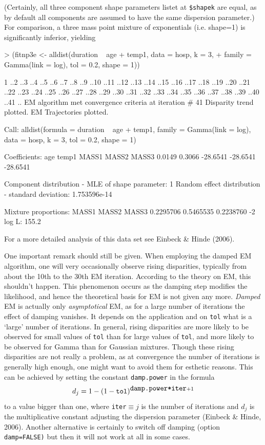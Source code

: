 \documentclass[a4paper]{article}
\begin{document}
\begin{landscape}
(Certainly, all three component shape parameters listet at {\tt \$shapek} are equal, as by default all components are assumed 
to have the same dispersion parameter.) For comparison, a three mass point mixture of exponentials (i.e. shape=1) is significantly inferior, yielding
\begin{Schunk}
\begin{Sinput}
> (fitnp3e <- alldist(duration ~ age + temp1, data = hosp, k = 3, 
+     family = Gamma(link = log), tol = 0.2, shape = 1))
\end{Sinput}
\begin{Soutput}
1 ..2 ..3 ..4 ..5 ..6 ..7 ..8 ..9 ..10 ..11 ..12 ..13 ..14 ..15 ..16 ..17 ..18 ..19 ..20 ..21 ..22 ..23 ..24 ..25 ..26 ..27 ..28 ..29 ..30 ..31 ..32 ..33 ..34 ..35 ..36 ..37 ..38 ..39 ..40 ..41 ..
EM algorithm met convergence criteria at iteration #  41 
Disparity trend plotted.
EM Trajectories plotted.

Call:  alldist(formula = duration ~ age + temp1, family = Gamma(link = log),      data = hosp, k = 3, tol = 0.2, shape = 1) 

Coefficients:
     age     temp1     MASS1     MASS2     MASS3  
  0.0149    0.3066  -28.6541  -28.6541  -28.6541  

Component distribution - MLE of shape parameter:	   1 
Random effect distribution - standard deviation:	   1.753596e-14 

Mixture proportions:
    MASS1      MASS2      MASS3  
0.2295706  0.5465535  0.2238760  
-2 log L:	    155.2 
\end{Soutput}
\end{Schunk}
 
 For a more detailed analysis of this data set see Einbeck \& Hinde (2006).
 
One important remark should still be given. When employing the damped EM algorithm, 
one will very occasionally observe rising disparities, typically from about the 10th to the 30th EM iteration. 
According to the theory on EM, this shouldn't happen. This phenomenon occurs as 
 the damping step modifies the likelihood,  and hence the theoretical basis for EM is not given any more. 
 {\it Damped} EM is actually only {\it asymptotical} EM, 
 as for a large number of iterations the effect of damping vanishes.  It depends on the application
 and on {\tt tol} what is a `large' number of iterations. In general, rising disparities are more likely to be observed for small values of {\tt tol}  than
 for large values of {\tt tol}, and more likely to be observed for Gamma than for Gaussian mixtures.
   Though these rising disparities are not really a problem, as at convergence the number of
 iterations is generally high enough, one might want to avoid them for esthetic reasons. This can be achieved by setting
 the constant {\tt damp.power} in the formula
 \[
 d_j= 1-(1-\mbox{\tt tol})^{\mbox{\tt damp.power*iter}+1}
 \]
 to a value bigger than one, where {\tt iter}$\equiv j$ is the number of iterations and $d_j$ is the multiplicative 
 constant adjusting the dispersion parameter (Einbeck \& Hinde, 2006). Another alternative is certainly to switch off damping
 (option {\tt damp=FALSE)} but then it will not work at all in some cases.
 

\end{landscape}
\end{document}
